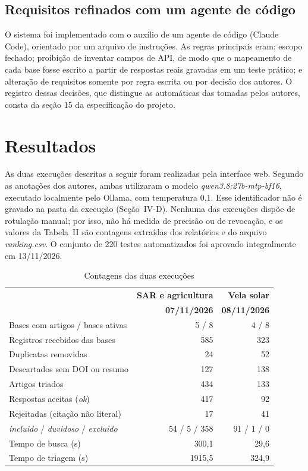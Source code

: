 \documentclass[10pt,a4paper,twocolumn]{article}
\newcommand{\cod}[1]{\textit{#1}}
\begin{document}
\subsection{Requisitos refinados com um agente de código}

O sistema foi implementado com o auxílio de um agente de código (Claude Code), orientado por um arquivo de instruções. As regras principais eram: escopo fechado; proibição de inventar campos de API, de modo que o mapeamento de cada base fosse escrito a partir de respostas reais gravadas em um teste prático; e alteração de requisitos somente por regra escrita ou por decisão dos autores. O registro dessas decisões, que distingue as automáticas das tomadas pelos autores, consta da seção 15 da especificação do projeto.

\section{Resultados}

As duas execuções descritas a seguir foram realizadas pela interface web. Segundo as anotações dos autores, ambas utilizaram o modelo \cod{qwen3.8:27b-mtp-bf16}, executado localmente pelo Ollama, com temperatura 0,1. Esse identificador não é gravado na pasta da execução (Seção~IV-D). Nenhuma das execuções dispõe de rotulação manual; por isso, não há medida de precisão ou de revocação, e os valores da Tabela~II são contagens extraídas dos relatórios e do arquivo \cod{ranking.csv}. O conjunto de 220 testes automatizados foi aprovado integralmente em 13/11/2026.

\begin{table}[!t]
  \caption{Contagens das duas execuções}
  \label{tab:resultados}
  \centering\fontsize{8}{9.5}\selectfont
  \begin{tabular}{@{}lrr@{}}
    \toprule
    & \textbf{SAR e agricultura} & \textbf{Vela solar} \\
    & \textbf{07/11/2026} & \textbf{08/11/2026} \\
    \midrule
    Bases com artigos / bases ativas & 5 / 8 & 4 / 8 \\
    Registros recebidos das bases & 585 & 323 \\
    Duplicatas removidas & 24 & 52 \\
    Descartados sem DOI ou resumo & 127 & 138 \\
    Artigos triados & 434 & 133 \\
    Respostas aceitas (\cod{ok}) & 417 & 92 \\
    Rejeitadas (citação não literal) & 17 & 41 \\
    \cod{incluido} / \cod{duvidoso} / \cod{excluido} & 54 / 5 / 358 & 91 / 1 / 0 \\
    Tempo de busca (s) & 300,1 & 29,6 \\
    Tempo de triagem (s) & 1915,5 & 324,9 \\
    \bottomrule
  \end{tabular}
\end{table}
\end{document}
